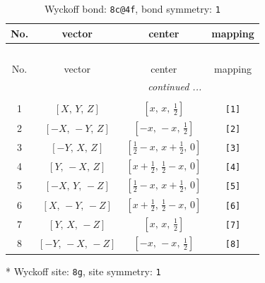 \documentclass[fleqn,8pt]{jsarticle}
\begin{document}
\renewcommand{\arraystretch}{1.2}
\begin{longtable}{cccc}
\caption{Wyckoff bond: {\tt 8c@4f}, bond symmetry: {\tt 1}}
 \\
 \hline \hline
No. & vector & center & mapping \\ \hline \endfirsthead

\multicolumn{3}{l}{\tablename\ \thetable{}} \\
 \hline \hline
No. & vector & center & mapping \\ \hline \endhead

 \hline \hline
\multicolumn{3}{r}{\footnotesize\it continued ...} \\ \endfoot

 \hline \hline
\multicolumn{3}{r}{} \\ \endlastfoot

1 & $\left[ X,\, Y,\, Z \right]$ & $\left[ x,\, x,\, \frac{1}{2} \right]$ & {\tt [1]} \\ \hline
2 & $\left[ - X,\, - Y,\, Z \right]$ & $\left[ - x,\, - x,\, \frac{1}{2} \right]$ & {\tt [2]} \\ \hline
3 & $\left[ - Y,\, X,\, Z \right]$ & $\left[ \frac{1}{2} - x,\, x + \frac{1}{2},\, 0 \right]$ & {\tt [3]} \\ \hline
4 & $\left[ Y,\, - X,\, Z \right]$ & $\left[ x + \frac{1}{2},\, \frac{1}{2} - x,\, 0 \right]$ & {\tt [4]} \\ \hline
5 & $\left[ - X,\, Y,\, - Z \right]$ & $\left[ \frac{1}{2} - x,\, x + \frac{1}{2},\, 0 \right]$ & {\tt [5]} \\ \hline
6 & $\left[ X,\, - Y,\, - Z \right]$ & $\left[ x + \frac{1}{2},\, \frac{1}{2} - x,\, 0 \right]$ & {\tt [6]} \\ \hline
7 & $\left[ Y,\, X,\, - Z \right]$ & $\left[ x,\, x,\, \frac{1}{2} \right]$ & {\tt [7]} \\ \hline
8 & $\left[ - Y,\, - X,\, - Z \right]$ & $\left[ - x,\, - x,\, \frac{1}{2} \right]$ & {\tt [8]} \\
\end{longtable}
* Wyckoff site: {\tt 8g}, site symmetry: {\tt 1}
\renewcommand{\arraystretch}{1.2}
\end{document}
